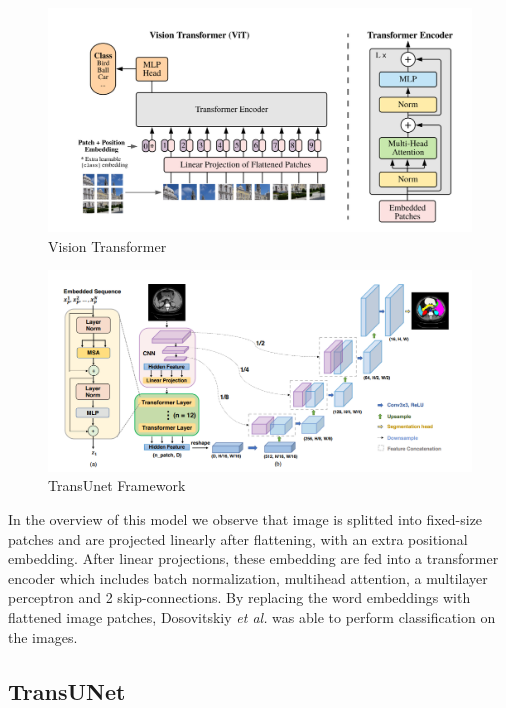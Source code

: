\documentclass{IEEEtran}
\begin{document}
\begin{figure}[h]
    \centering
    \includegraphics[width=\textwidth]{img/ViT.png}
    \caption{Vision Transformer}\label{fig:vit}
\end{figure}

\begin{figure}[h]
    \centering
    \includegraphics[width=\textwidth]{img/transunet.png}
    \caption{TransUnet Framework}\label{fig:tunet}
\end{figure}

In the overview of this model we observe that image is splitted into fixed-size patches and are projected linearly after flattening, with an extra positional embedding. After linear projections, these embedding are fed into a transformer encoder which includes batch normalization, multihead attention, a multilayer perceptron and 2 skip-connections. By replacing the word embeddings with flattened image patches, Dosovitskiy \textit{et al.} was able to perform classification on the images.   

\subsection{TransUNet}
\end{document}
